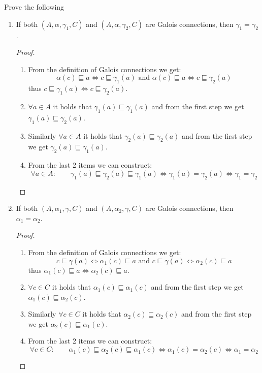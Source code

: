 Prove the following
\begin{enumerate}
	\item If both $(A, \alpha, \gamma_1, C)$ and $(A, \alpha, \gamma_2, C)$ are Galois connections, then $\gamma_1 = \gamma_2$.
	\begin{proof}
		\begin{enumerate}
			\item From the definition of Galois connections we get:
			\begin{equation*}
			\alpha(c) \sqsubseteq a \iff c \sqsubseteq \gamma_1(a) \text{ and } \alpha(c) \sqsubseteq a \iff c \sqsubseteq \gamma_2(a) 
			\end{equation*}
			thus $c \sqsubseteq \gamma_1(a)\iff c \sqsubseteq \gamma_2(a)$.
			\item $\forall a \in A$ it holds that $\gamma_1(a) \sqsubseteq \gamma_1(a)$ and from the first step we get $\gamma_1(a) \sqsubseteq \gamma_2(a)$.
			\item Similarly $\forall a \in A$ it holds that $\gamma_2(a) \sqsubseteq \gamma_2(a)$ and from the first step we get $\gamma_2(a) \sqsubseteq \gamma_1(a)$.
			\item From the last 2 items we can construct:
			\begin{equation*}
			\forall a \in A: \qquad \gamma_1(a) \sqsubseteq \gamma_2(a) \sqsubseteq \gamma_1(a) \iff \gamma_1(a) = \gamma_2(a) \iff \gamma_1 = \gamma_2
			\end{equation*}
		\end{enumerate}
	\end{proof}
	\item If both $(A, \alpha_1, \gamma, C)$ and $(A, \alpha_2, \gamma, C)$ are Galois connections, then $\alpha_1 = \alpha_2$.
	\begin{proof}
		\begin{enumerate}
			\item From the definition of Galois connections we get:
			\begin{equation*}
				c \sqsubseteq \gamma(a) \iff \alpha_1(c)\sqsubseteq a \text{ and } c \sqsubseteq \gamma(a) \iff \alpha_2(c) \sqsubseteq a
			\end{equation*}
			thus $\alpha_1(c)\sqsubseteq a \iff \alpha_2(c) \sqsubseteq a$.
			\item $\forall c \in C$ it holds that $\alpha_1(c) \sqsubseteq \alpha_1(c)$ and from the first step we get $\alpha_1(c) \sqsubseteq \alpha_2(c)$.
			\item Similarly $\forall c \in C$ it holds that $\alpha_2(c) \sqsubseteq \alpha_2(c)$ and from the first step we get $\alpha_2(c) \sqsubseteq \alpha_1(c)$.
			\item From the last 2 items we can construct:
			\begin{equation*}
				\forall c \in C:\qquad \alpha_1(c) \sqsubseteq \alpha_2(c) \sqsubseteq \alpha_1(c) \iff \alpha_1(c) = \alpha_2(c) \iff \alpha_1 = \alpha_2
			\end{equation*}
		\end{enumerate}
	\end{proof}
\end{enumerate}